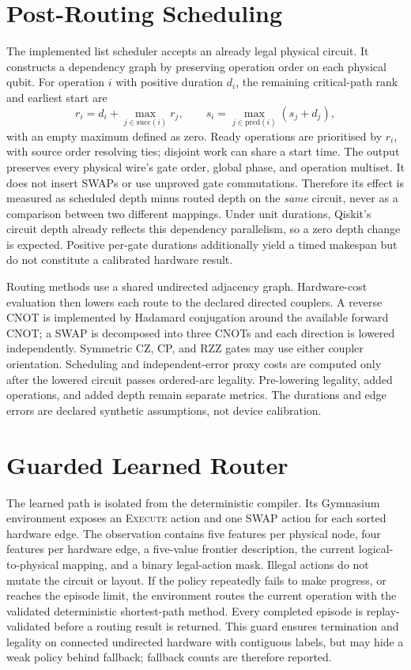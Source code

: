 \documentclass[a4paper,10pt,twocolumn]{article}
\begin{document}
\section{Post-Routing Scheduling}
The implemented list scheduler accepts an already legal physical circuit.
It constructs a dependency graph by preserving operation order on each
physical qubit. For operation $i$ with positive duration $d_i$, the
remaining critical-path rank and earliest start are
\begin{equation}
 r_i=d_i+\max_{j\in\mathrm{succ}(i)}r_j,
 \qquad s_i=\max_{j\in\mathrm{pred}(i)}(s_j+d_j),
\end{equation}
with an empty maximum defined as zero. Ready operations are prioritised by
$r_i$, with source order resolving ties; disjoint work can share a start
time. The output preserves every physical wire's gate order, global phase,
and operation multiset. It does not insert SWAPs or use unproved gate
commutations. Therefore its effect is measured as scheduled depth minus
routed depth on the \emph{same} circuit, never as a comparison between two
different mappings. Under unit durations, Qiskit's circuit depth already
reflects this dependency parallelism, so a zero depth change is expected.
Positive per-gate durations additionally yield a timed makespan but do not
constitute a calibrated hardware result.

Routing methods use a shared undirected adjacency graph. Hardware-cost
evaluation then lowers each route to the declared directed couplers. A reverse
CNOT is implemented by Hadamard conjugation around the available forward
CNOT; a SWAP is decomposed into three CNOTs and each direction is lowered
independently. Symmetric CZ, CP, and RZZ gates may use either coupler
orientation. Scheduling and independent-error proxy costs are computed only
after the lowered circuit passes ordered-arc legality. Pre-lowering legality,
added operations, and added depth remain separate metrics. The durations and
edge errors are declared synthetic assumptions, not device calibration.

\section{Guarded Learned Router}
The learned path is isolated from the deterministic compiler. Its Gymnasium
environment exposes an \textsc{Execute} action and one SWAP action for each
sorted hardware edge. The observation contains five features per physical
node, four features per hardware edge, a five-value frontier description,
the current logical-to-physical mapping, and a binary legal-action mask.
Illegal actions do not mutate the circuit or layout. If the policy repeatedly
fails to make progress, or reaches the episode limit, the environment routes
the current operation with the validated deterministic shortest-path method.
Every completed episode is replay-validated before a routing result is
returned. This guard ensures termination and legality on connected undirected
hardware with contiguous labels, but may hide a weak policy behind fallback;
fallback counts are therefore reported.
\end{document}
